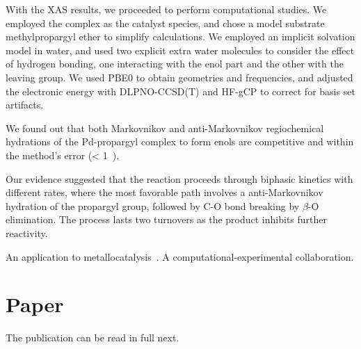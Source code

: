 With the XAS results, we proceeded to perform computational studies.
We employed the  complex as the catalyst species, and chose a
model substrate methylpropargyl ether to simplify calculations.
We employed an implicit solvation model in water, and used two explicit extra
water molecules to consider the effect of hydrogen bonding, one interacting
with the enol part and the other with the leaving group.
We used PBE0 to obtain geometries and frequencies, and adjusted the electronic
energy with DLPNO-CCSD(T) and HF-gCP to correct for basis set artifacts.

We found out that both Markovnikov and anti-Markovnikov regiochemical
hydrations of the Pd-propargyl complex to form enols are competitive and within
the method's error (< 1~\kcalmol).

Our evidence suggested that the reaction proceeds through biphasic kinetics
with different rates, where the most favorable path involves a 
anti-Markovnikov hydration of the propargyl group, followed by C-O bond breaking
by $\beta$-O elimination.
The process lasts two turnovers as the product inhibits further
reactivity.

An application to metallocatalysis~\cite{Coelho2019}.
A computational-experimental collaboration.



\section{Paper}

The publication can be read in full next.



